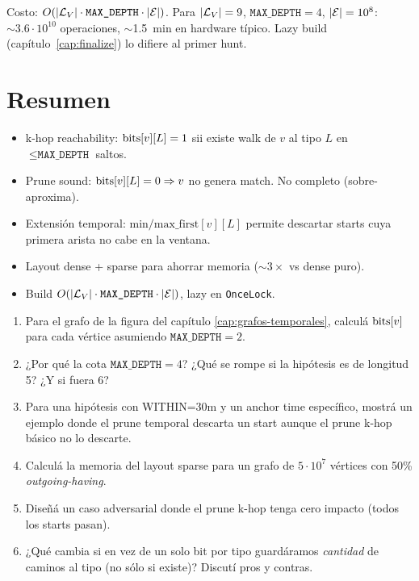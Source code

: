 \noindent
Costo: \(O(|\mathcal{L}_V| \cdot \texttt{MAX\_DEPTH} \cdot |\mathcal{E}|)\). Para
\(|\mathcal{L}_V| = 9\), \(\texttt{MAX\_DEPTH} = 4\), \(|\mathcal{E}| = 10^8\): \(\sim
3.6 \cdot 10^{10}\) operaciones, $\sim$1.5~min en hardware típico.
Lazy build (capítulo~\ref{cap:finalize}) lo difiere al primer
hunt.

\section{Resumen}

\begin{itemize}
    \item k-hop reachability: \(\mathrm{bits}[v][L] = 1\) sii existe walk
    de \(v\) al tipo \(L\) en \(\leq \texttt{MAX\_DEPTH}\) saltos.
    \item Prune sound: \(\mathrm{bits}[v][L] = 0 \Rightarrow v\) no genera
    match. No completo (sobre-aproxima).
    \item Extensión temporal: \(\mathrm{min/max\_first}[v][L]\)
    permite descartar starts cuya primera arista no cabe en la
    ventana.
    \item Layout dense + sparse para ahorrar memoria
    (\(\sim 3\times\) vs dense puro).
    \item Build \(O(|\mathcal{L}_V| \cdot \texttt{MAX\_DEPTH} \cdot |\mathcal{E}|)\),
    lazy en \texttt{OnceLock}.
\end{itemize}

\begin{ejercicios}
\begin{enumerate}
    \item \starred{} Para el grafo de la figura del capítulo
    \ref{cap:grafos-temporales}, calculá \(\mathrm{bits}[v]\) para cada
    vértice asumiendo \(\texttt{MAX\_DEPTH} = 2\).

    \item ¿Por qué la cota \(\texttt{MAX\_DEPTH} = 4\)? ¿Qué se
    rompe si la hipótesis es de longitud 5? ¿Y si fuera 6?

    \item \starred{} Para una hipótesis con WITHIN=30m y un
    anchor time específico, mostrá un ejemplo donde el prune
    temporal descarta un start aunque el prune k-hop básico no lo
    descarte.

    \item Calculá la memoria del layout sparse para un grafo de
    \(5 \cdot 10^7\) vértices con 50\% \emph{outgoing-having}.

    \item Diseñá un caso adversarial donde el prune k-hop tenga
    cero impacto (todos los starts pasan).

    \item ¿Qué cambia si en vez de un solo bit por tipo guardáramos
    \emph{cantidad} de caminos al tipo (no sólo si existe)?
    Discutí pros y contras.
\end{enumerate}
\end{ejercicios}
